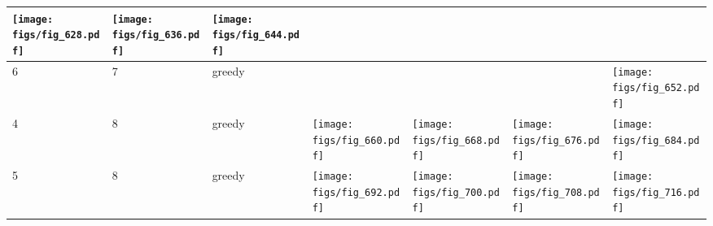\documentclass[oneside,canadian,landscape]{article}
\begin{document}
\begin{center}
\begin{longtable}{|l|l|l||l|l|l|l|}
\begin{minipage}{3.5cm}
\texttt{[image: figs/fig\_628.pdf]}
\end{minipage}
&\begin{minipage}{3.5cm}
\texttt{[image: figs/fig\_636.pdf]}
\end{minipage}
&\begin{minipage}{3.5cm}
\texttt{[image: figs/fig\_644.pdf]}
\end{minipage}
\\ \hline
6&7&greedy&&&&\begin{minipage}{3.5cm}
\texttt{[image: figs/fig\_652.pdf]}
\end{minipage}
\\ \hline
4&8&greedy&\begin{minipage}{3.5cm}
\texttt{[image: figs/fig\_660.pdf]}
\end{minipage}
&\begin{minipage}{3.5cm}
\texttt{[image: figs/fig\_668.pdf]}
\end{minipage}
&\begin{minipage}{3.5cm}
\texttt{[image: figs/fig\_676.pdf]}
\end{minipage}
&\begin{minipage}{3.5cm}
\texttt{[image: figs/fig\_684.pdf]}
\end{minipage}
\\ \hline
5&8&greedy&\begin{minipage}{3.5cm}
\texttt{[image: figs/fig\_692.pdf]}
\end{minipage}
&\begin{minipage}{3.5cm}
\texttt{[image: figs/fig\_700.pdf]}
\end{minipage}
&\begin{minipage}{3.5cm}
\texttt{[image: figs/fig\_708.pdf]}
\end{minipage}
&\begin{minipage}{3.5cm}
\texttt{[image: figs/fig\_716.pdf]}
\end{minipage}
\\ \hline
\end{longtable}
\end{center}
\end{document}
